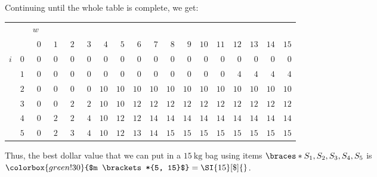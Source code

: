 Continuing until the whole table is complete, we get:
\begin{center}
    \begin{tabular}{cr|rrrrrrrrrrrrrrrr|}
        {}
            &
            & \multicolumn{16}{l|}{$w$} \\
        {}
            &
            & $\phantom{0}0$ & $\phantom{0}1$ & $\phantom{0}2$ & $\phantom{0}3$
            & $\phantom{0}4$ & $\phantom{0}5$ & $\phantom{0}6$ & $\phantom{0}7$
            & $\phantom{0}8$ & $\phantom{0}9$
            & $10$ & $11$ & $12$ &$13$ & $14$ & $15$ \\ \hline
        $i$
            & $0$
            & $0$ & $0$ & $0$ & $0$ & $0$ & $0$ & $0$ & $0$
            & $0$ & $0$ & $0$ & $0$ & $0$ & $0$ & $0$ & $0$ \\
        {}
            & $1$
            & $0$ & $0$ & $0$ & $0$ & $0$ & $0$ & $0$ & $0$
            & $0$ & $0$ & $0$ & $0$ & $4$ & $4$ & $4$ & $4$ \\
        {}
            & $2$
            & $0$ & $0$ & $0$ & $0$ & $10$ & $10$ & $10$ & $10$
            & $10$ & $10$ & $10$ & $10$ & $10$ & $10$ & $10$ & $10$ \\
        {}
            & $3$
            & $0$ & $0$ & $2$ & $2$ & $10$ & $10$ & $12$ & $12$
            & $12$ & $12$ & $12$ & $12$ & $12$ & $12$ & $12$ & $12$ \\
        {}
            & $4$
            & $0$ & $2$ & $2$ & $4$ & $10$ & $12$ & $12$ & $14$
            & $14$ & $14$ & $14$ & $14$ & $14$ & $14$ & $14$ & $14$ \\
        {}
            & $5$
            & $0$ & $2$ & $3$ & $4$ & $10$ & $12$ & $13$ & $14$
            & $15$ & $15$ & $15$ & $15$ & $15$ & $15$ & $15$
            & \cellcolor{green!30}$15$ \\ \hline
    \end{tabular}
\end{center}
\SkipAfterTable

Thus, the best dollar value that we can put in a $\qty{15}{\kilo\gram}$ bag using items $\braces*{S_1, S_2, S_3, S_4, S_5}$ is $\colorbox{green!30}{$m \brackets*{5, 15}$} = \SI{15}[\$]{}$.

